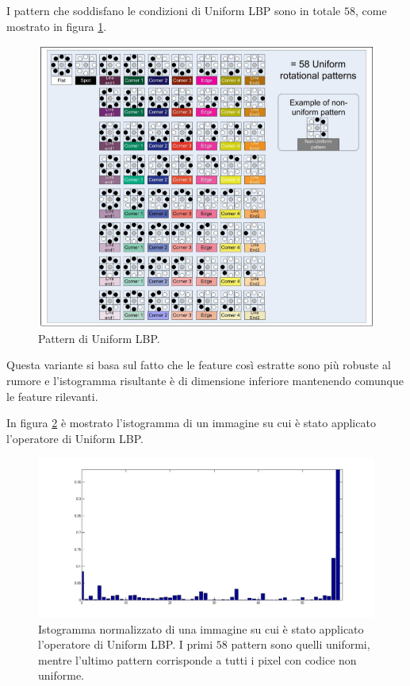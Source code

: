 I pattern che soddisfano le condizioni di Uniform LBP sono in totale $58$, come mostrato in figura \ref{fig:uniformLBP}. \\

\begin{figure}[ht]
\begin{center}
\includegraphics[width=.95\textwidth]{img/uniform_LBP}
\caption{ Pattern di Uniform LBP.}
\label{fig:uniformLBP}
\end{center}
\end{figure}

Questa variante si basa sul fatto che le feature così estratte sono più robuste al rumore e l'istogramma risultante è di dimensione inferiore mantenendo comunque le feature rilevanti.

\noindent In figura \ref{fig:istUniformLBP} è mostrato l'istogramma di un immagine su cui è stato applicato l'operatore di Uniform LBP. \\

\begin{figure}[ht]
\begin{center}
\includegraphics[width=.95\textwidth]{img/hist-uniform}
\caption{ Istogramma normalizzato di una immagine su cui è stato applicato l'operatore di Uniform \acs{LBP}. I primi $58$ pattern sono quelli uniformi, mentre l'ultimo pattern corrisponde a tutti i pixel con codice non uniforme.}
\label{fig:istUniformLBP}
\end{center}
\end{figure}

